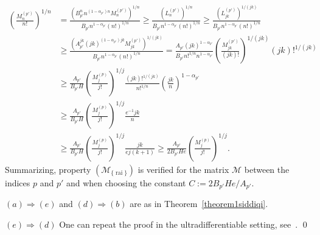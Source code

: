 \documentclass[11pt,a4paper]{article}
\theoremstyle{plain}
\theoremstyle{definition}
\newcommand{\CC}{\mathbb{C}}
\newcommand{\red}[1]{{\color{red}#1}}
\newcommand{\M}{\mathbb{M}}
\newcommand{\LL}{\mathbb{L}}
\newcommand{\G}{\mathbb{G}}
\let\on=\operatorname
\begin{document}
\begin{align*}
\left(\frac{M^{(p')}_{n}}{n!}\right)^{1/n}& =\frac{(B_{p'}^nn^{(1-\alpha_{p'})n}M^{(p')}_{n})^{1/n}}{B_{p'}n^{1-\alpha_{p'}}(n!)^{1/n}} \ge\frac{(L^{(p')}_{n})^{1/n}}{B_{p'}n^{1-\alpha_{p'}}(n!)^{1/n}} \ge\frac{(L^{(p')}_{jk})^{1/(jk)}}{B_{p'}n^{1-\alpha_{p'}}(n!)^{1/n}}
	\\& \ge%
\frac{(A_{p'}^{jk}(jk)^{(1-\alpha_{p'})jk}M^{(p')}_{jk})^{1/(jk)}}{B_{p'}n^{1-\alpha_{p'}}(n!)^{1/n}}
=\frac{A_{p'}(jk)^{1-\alpha_{p'}}}{B_{p'}n!^{1/n}n^{1-\alpha_{p'}}} \left(\frac{M^{(p')}_{jk}}{(jk)!}\right)^{1/(jk)}(jk)!^{1/(jk)}
\\&
\ge\frac{A_{p'}}{B_{p'}H}\left(\frac{M^{(p)}_j}{j!}\right)^{1/j} \frac{(jk)!^{1/(jk)}}{n!^{1/n}}\left(\frac{jk}{n}\right)^{1-\alpha_{p'}}
\\&
\ge\frac{A_{p'}}{B_{p'}H}\left(\frac{M^{(p)}_j}{j!}\right)^{1/j} \frac{e^{-1}jk}{n}%
	\\&
\ge\frac{A_{p'}}{B_{p'}H}\left(\frac{M^{(p)}_j}{j!}\right)^{1/j} \frac{jk}{ej(k+1)}%
\ge\frac{A_{p'}}{2B_{p'}He} \left(\frac{M^{(p)}_j}{j!}\right)^{1/j}.
\end{align*}
Summarizing, property \hyperlink{R-rai}{$(\mathcal{M}_{\{\on{rai}\}})$} is verified for the matrix $\mathcal{M}$ between the indices $p$ and $p'$ and when choosing the constant $C:=2B_{p'}He/A_{p'}$.\vspace{6pt}

$(a)\Rightarrow(e)$ and $(d)\Rightarrow(b)$ are as in Theorem~\ref{theorem1siddiqi}.
\vspace{6pt}

$(e)\Rightarrow(d)$ One can repeat the proof in the ultradifferentiable setting, see~\cite[Thm. 8.3.1]{dissertation}.
\qed\enddemo


\end{document}
